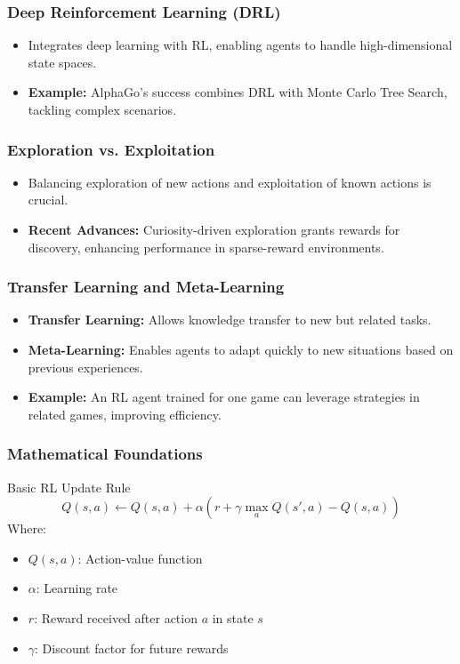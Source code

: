 \documentclass[aspectratio=169]{beamer}
\begin{document}
\begin{frame}[fragile]
    \frametitle{Deep Reinforcement Learning (DRL)}
    \begin{itemize}
        \item Integrates deep learning with RL, enabling agents to handle high-dimensional state spaces.
        \item \textbf{Example:} AlphaGo's success combines DRL with Monte Carlo Tree Search, tackling complex scenarios.
    \end{itemize}
\end{frame}

\begin{frame}[fragile]
    \frametitle{Exploration vs. Exploitation}
    \begin{itemize}
        \item Balancing exploration of new actions and exploitation of known actions is crucial.
        \item \textbf{Recent Advances:} Curiosity-driven exploration grants rewards for discovery, enhancing performance in sparse-reward environments.
    \end{itemize}
\end{frame}

\begin{frame}[fragile]
    \frametitle{Transfer Learning and Meta-Learning}
    \begin{itemize}
        \item \textbf{Transfer Learning:} Allows knowledge transfer to new but related tasks.
        \item \textbf{Meta-Learning:} Enables agents to adapt quickly to new situations based on previous experiences.
        \item \textbf{Example:} An RL agent trained for one game can leverage strategies in related games, improving efficiency.
    \end{itemize}
\end{frame}

\begin{frame}[fragile]
    \frametitle{Mathematical Foundations}
    \begin{block}{Basic RL Update Rule}
        \begin{equation}
        Q(s, a) \leftarrow Q(s, a) + \alpha \left( r + \gamma \max_a Q(s', a) - Q(s, a) \right)
        \end{equation}
        Where:
        \begin{itemize}
            \item $Q(s,a)$: Action-value function
            \item $\alpha$: Learning rate
            \item $r$: Reward received after action $a$ in state $s$
            \item $\gamma$: Discount factor for future rewards
        \end{itemize}
    \end{block}
\end{frame}
\end{document}
